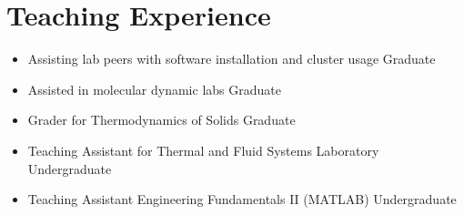 \section{Teaching Experience}

\begin{itemize}
    \item Assisting lab peers with software installation and cluster usage \hfill Graduate
    \item Assisted in molecular dynamic labs \hfill Graduate
    \item Grader for Thermodynamics of Solids \hfill Graduate
    \item Teaching Assistant for Thermal and Fluid Systems Laboratory \hfill Undergraduate
    \item Teaching Assistant Engineering Fundamentals II (MATLAB) \hfill Undergraduate
\end{itemize}
